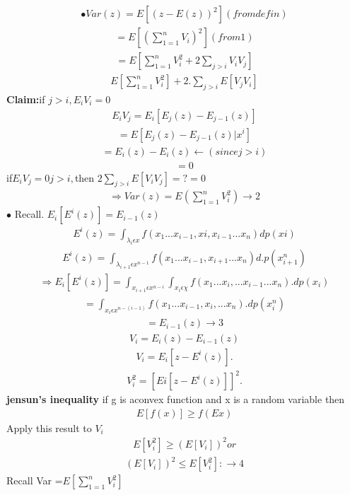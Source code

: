 \documentclass[journal,12pt,twocolumn]{IEEEtran}
\renewcommand\thesection{\arabic{section}}
\begin{document}
\begin{enumerate}[label=\thesection.\arabic*,ref=\thesection.\theenumi]
\begin{align}
\bullet Var(z)=E[(z-E(z))^2] (from defin)
\end{align}
\begin{align}
=E[(\sum_{1=1}^{n} V_i)^2] (from 1)
\end{align}
\begin{align}
=E[\sum_{1=1}^{n} V_i^2 +2\sum_{j>i} V_i V _j]
\end{align}
\begin{align}
E[\sum_{1=1}^{n} V_i^2]+2.\sum_{j>i}E[V_j V_i]
\end{align}
\textbf{Claim:}if $j>i,E_i V_i=0$
\begin{align}
E_iV_j=E_i[E_j(z)-E_{j-1}(z)]
\end{align}
\begin{align}
=E[E_j(z)-E_{j-1}(z)|x^i]
\end{align}
\begin{align}
=E_i(z)-E_i(z)\leftarrow(since j>i)
\end{align}
\begin{align}
=0
\end{align}
if$E_i V_j=0 j>i,$then $2\sum_{j>i}E[V_iV_j]=?=0$
\begin{align}
\Rightarrow Var(z)=E(\sum_{1=1}^{n} V_i^2)\rightarrow2
\end{align}
$\bullet$ Recall. $E_i[E^i(z)]=E_{i-1}(z)$
\begin{align}
E^i(z)=\int_{\lambda_i \epsilon x}f(x_1...x_{i-1},xi,x_{i-1}...x_n)dp(xi)
\end{align}
\begin{align}
E^i(z)=\int_{\lambda_{i+1} \epsilon x^{n-1}}f(x_1...x_{i-1},x_{i+1}...x_n)d.p(x_{i+1}^n)
\end{align}
\begin{align}
\Rightarrow E_i[E^i(z)]=\int_{x_{i+1} \epsilon x^{n-i}} \int_{x_i \epsilon \chi}f(x_1...x_i,...x_{i-1}...x_n).dp(x_i)
\end{align}
\begin{align}
=\int_{x_i \epsilon x^{n-(i-1)}}f(x_1...x_{i-1},x_i,...x_n).dp(x_i^n)
\end{align}
\begin{align}
=E_{i-1}(z)\rightarrow 3
\end{align}
\begin{align}
V_i=E_i(z)-E_{i-1}(z)
\end{align}
\begin{align}
V_i=E_i[z-E^i(z)].
\end{align}
\begin{align}
V_i^2=[Ei[z-E^i(z)]]^2.
\end{align}
\textbf{jensun's inequality} if g is aconvex function and x is a random variable then
\begin{align}
E[f(x)] \geqslant f(E{x})
\end{align}
Apply this result to $V_i$
\begin{align}
E[V_i^2] \geqslant (E[V_i])^2 or
\end{align}
\begin{align}
(E[V_i])^2\leqslant E[V_i^2]:\rightarrow 4
\end{align}
 Recall Var =$E[\sum_{1=1}^{n} V_i^2]$
\end{enumerate}
\end{document}
